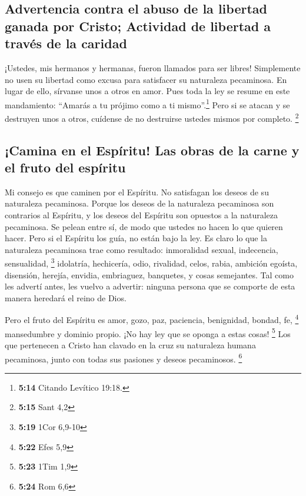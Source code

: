 \hypertarget{advertencia-contra-el-abuso-de-la-libertad-ganada-por-cristo-actividad-de-libertad-a-travuxe9s-de-la-caridad}{%
\subsection{Advertencia contra el abuso de la libertad ganada por
Cristo; Actividad de libertad a través de la
caridad}\label{advertencia-contra-el-abuso-de-la-libertad-ganada-por-cristo-actividad-de-libertad-a-travuxe9s-de-la-caridad}}

 ¡Ustedes, mis hermanos y hermanas, fueron llamados para
ser libres! Simplemente no usen su libertad como excusa para satisfacer
su naturaleza pecaminosa. En lugar de ello, sírvanse unos a otros en
amor.  Pues toda la ley se resume en este mandamiento:
``Amarás a tu prójimo como a ti mismo''.\footnote{\textbf{5:14} Citando
  Levítico 19:18.}  Pero si se atacan y se destruyen unos
a otros, cuídense de no destruirse ustedes mismos por completo.
\footnote{\textbf{5:15} Sant 4,2}

\hypertarget{camina-en-el-espuxedritu-las-obras-de-la-carne-y-el-fruto-del-espuxedritu}{%
\subsection{¡Camina en el Espíritu! Las obras de la carne y el fruto del
espíritu}\label{camina-en-el-espuxedritu-las-obras-de-la-carne-y-el-fruto-del-espuxedritu}}

 Mi consejo es que caminen por el Espíritu. No satisfagan
los deseos de su naturaleza pecaminosa.  Porque los
deseos de la naturaleza pecaminosa son contrarios al Espíritu, y los
deseos del Espíritu son opuestos a la naturaleza pecaminosa. Se pelean
entre sí, de modo que ustedes no hacen lo que quieren hacer.
 Pero si el Espíritu los guía, no están bajo la ley.
 Es claro lo que la naturaleza pecaminosa trae como
resultado: inmoralidad sexual, indecencia, sensualidad, \footnote{\textbf{5:19}
  1Cor 6,9-10}  idolatría, hechicería, odio, rivalidad,
celos, rabia, ambición egoísta, disensión, herejía, 
envidia, embriaguez, banquetes, y cosas semejantes. Tal como les advertí
antes, les vuelvo a advertir: ninguna persona que se comporte de esta
manera heredará el reino de Dios.

 Pero el fruto del Espíritu es amor, gozo, paz,
paciencia, benignidad, bondad, fe, \footnote{\textbf{5:22} Efes 5,9}
 mansedumbre y dominio propio. ¡No hay ley que se oponga
a estas cosas! \footnote{\textbf{5:23} 1Tim 1,9}  Los que
pertenecen a Cristo han clavado en la cruz su naturaleza humana
pecaminosa, junto con todas sus pasiones y deseos pecaminosos.
\footnote{\textbf{5:24} Rom 6,6}

